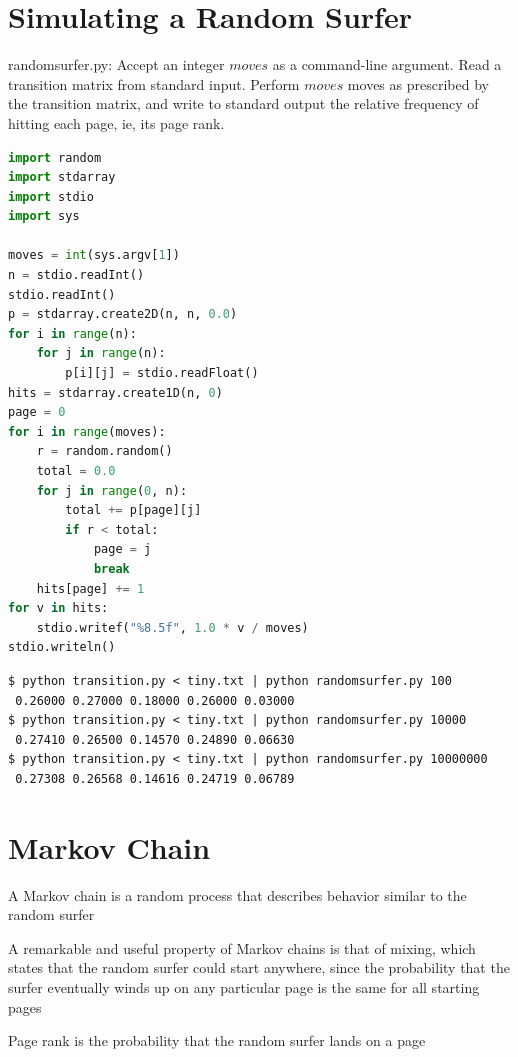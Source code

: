 \documentclass[8pt,a4paper,compress]{beamer}
\begin{document}
\section{Simulating a Random Surfer}
\begin{frame}[fragile]
\pause

\begin{framed}
\tiny randomsurfer.py: Accept an integer $moves$ as a command-line argument. Read a transition matrix from standard input. Perform $moves$ moves as prescribed by the transition matrix, and write to standard output the relative frequency of hitting each page, ie, its page rank.
\end{framed}

\begin{lstlisting}[language=Python]
import random
import stdarray
import stdio
import sys

moves = int(sys.argv[1])
n = stdio.readInt()
stdio.readInt()
p = stdarray.create2D(n, n, 0.0)
for i in range(n):
    for j in range(n):
        p[i][j] = stdio.readFloat()
hits = stdarray.create1D(n, 0)
page = 0
for i in range(moves):
    r = random.random()
    total = 0.0
    for j in range(0, n):
        total += p[page][j]
        if r < total:
            page = j
            break
    hits[page] += 1
for v in hits:
    stdio.writef("%8.5f", 1.0 * v / moves)
stdio.writeln()
\end{lstlisting}
\end{frame}

\begin{frame}[fragile]
\pause

\begin{lstlisting}[language={}]
$ python transition.py < tiny.txt | python randomsurfer.py 100
 0.26000 0.27000 0.18000 0.26000 0.03000
$ python transition.py < tiny.txt | python randomsurfer.py 10000
 0.27410 0.26500 0.14570 0.24890 0.06630
$ python transition.py < tiny.txt | python randomsurfer.py 10000000
 0.27308 0.26568 0.14616 0.24719 0.06789
\end{lstlisting}
\end{frame}

\section{Markov Chain}
\begin{frame}[fragile]
\pause

A Markov chain is a random process that describes behavior similar to the random surfer

\pause
\bigskip

A remarkable and useful property of Markov chains is that of mixing, which states that the random surfer could start anywhere, since the probability that the surfer eventually winds up on any particular page is the same for all starting pages

\pause
\bigskip

Page rank is the probability that the random surfer lands on a page
\end{frame}
\end{document}
